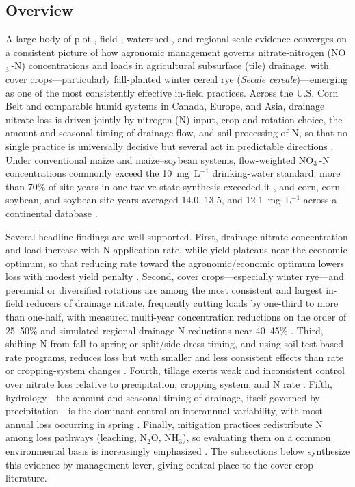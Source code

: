\subsection{Overview}

A large body of plot-, field-, watershed-, and regional-scale evidence converges on a consistent picture of how agronomic management governs nitrate-nitrogen (NO$_3^-$-N) concentrations and loads in agricultural subsurface (tile) drainage, with cover crops---particularly fall-planted winter cereal rye (\emph{Secale cereale})---emerging as one of the most consistently effective in-field practices. Across the U.S. Corn Belt and comparable humid systems in Canada, Europe, and Asia, drainage nitrate loss is driven jointly by nitrogen (N) input, crop and rotation choice, the amount and seasonal timing of drainage flow, and soil processing of N, so that no single practice is universally decisive but several act in predictable directions \parencite{Dinnes2002}. Under conventional maize and maize--soybean systems, flow-weighted NO$_3^-$-N concentrations commonly exceed the 10~mg~L$^{-1}$ drinking-water standard: more than 70\% of site-years in one twelve-state synthesis exceeded it \parencite{Liu2021}, and corn, corn--soybean, and soybean site-years averaged 14.0, 13.5, and 12.1~mg~L$^{-1}$ across a continental database \parencite{Hertzberger2019}.

Several headline findings are well supported. First, drainage nitrate concentration and load increase with N application rate, while yield plateaus near the economic optimum, so that reducing rate toward the agronomic/economic optimum lowers loss with modest yield penalty \parencite{Jaynes2001,Helmers2012b,Zhao2016,Hertzberger2019}. Second, cover crops---especially winter rye---and perennial or diversified rotations are among the most consistent and largest in-field reducers of drainage nitrate, frequently cutting loads by one-third to more than one-half, with measured multi-year concentration reductions on the order of 25--50\% and simulated regional drainage-N reductions near 40--45\% \parencite{Ruffatti2019,OBrien2022,PrezaFontes2021,Daigh2015b,Gentry2025,Kaspar2012,Malone2018,Feyereisen2006b,Malone2014b}. Third, shifting N from fall to spring or split/side-dress timing, and using soil-test-based rate programs, reduces loss but with smaller and less consistent effects than rate or cropping-system changes \parencite{Randall2003,Dinnes2002,Jaynes2004}. Fourth, tillage exerts weak and inconsistent control over nitrate loss relative to precipitation, cropping system, and N rate \parencite{RANDALL1995,Weed1996,Randall2001}. Fifth, hydrology---the amount and seasonal timing of drainage, itself governed by precipitation---is the dominant control on interannual variability, with most annual loss occurring in spring \parencite{Randall2003,Bakhsh2010,RANDALL1995}. Finally, mitigation practices redistribute N among loss pathways (leaching, N$_2$O, NH$_3$), so evaluating them on a common environmental basis is increasingly emphasized \parencite{PrezaFontes2023,Menegaz2025}. The subsections below synthesize this evidence by management lever, giving central place to the cover-crop literature.

